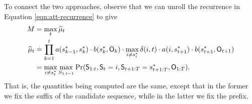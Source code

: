 To connect the two approaches, observe that we can unroll the recurrence in Equation \ref{eqn:att-recurrence} to give
\begin{align*}
	M &= \max_t \widehat{\mu}_t \\
	\widehat{\mu}_{t} &\stackrel{.}{=} \prod_{k = 1}^t a( s^*_{k-1}, s^*_{k} ) \cdot b( s^*_{k}, \mathsf{O}_{k} ) \cdot \max_{i \neq s^*_{t}} \delta(i, t) \cdot a( i, s^*_{t+1} ) \cdot b( s^*_{t+1}, \mathsf{O}_{t+1} ) \\
	&= \max_{i \neq s^*_{t}} \max_{S_{1:t-1}} {\Pr( \mathsf{S}_{1:t}, \mathsf{S}_t = i, \mathsf{S}_{t+1:T} = s^*_{t+1:T}, \mathsf{O}_{1:T} )}.
\end{align*}
That is, the quantities being computed are the same, except that in the former we fix the suffix of the candidate sequence, while in the latter we fix the prefix.
